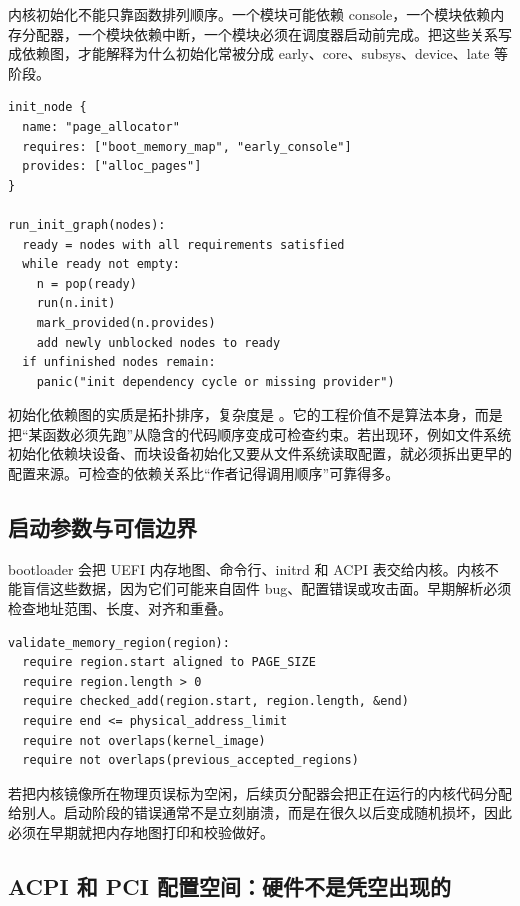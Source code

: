 内核初始化不能只靠函数排列顺序。一个模块可能依赖 console，一个模块依赖内存分配器，一个模块依赖中断，一个模块必须在调度器启动前完成。把这些关系写成依赖图，才能解释为什么初始化常被分成 early、core、subsys、device、late 等阶段。

\begin{lstlisting}
init_node {
  name: "page_allocator"
  requires: ["boot_memory_map", "early_console"]
  provides: ["alloc_pages"]
}

run_init_graph(nodes):
  ready = nodes with all requirements satisfied
  while ready not empty:
    n = pop(ready)
    run(n.init)
    mark_provided(n.provides)
    add newly unblocked nodes to ready
  if unfinished nodes remain:
    panic("init dependency cycle or missing provider")
\end{lstlisting}

\begin{keyidea}
初始化依赖图的实质是拓扑排序，复杂度是 。它的工程价值不是算法本身，而是把“某函数必须先跑”从隐含的代码顺序变成可检查约束。若出现环，例如文件系统初始化依赖块设备、而块设备初始化又要从文件系统读取配置，就必须拆出更早的配置来源。可检查的依赖关系比“作者记得调用顺序”可靠得多。
\end{keyidea}

\subsection{启动参数与可信边界}

bootloader 会把 UEFI 内存地图、命令行、initrd 和 ACPI 表交给内核。内核不能盲信这些数据，因为它们可能来自固件 bug、配置错误或攻击面。早期解析必须检查地址范围、长度、对齐和重叠。

\begin{lstlisting}
validate_memory_region(region):
  require region.start aligned to PAGE_SIZE
  require region.length > 0
  require checked_add(region.start, region.length, &end)
  require end <= physical_address_limit
  require not overlaps(kernel_image)
  require not overlaps(previous_accepted_regions)
\end{lstlisting}

若把内核镜像所在物理页误标为空闲，后续页分配器会把正在运行的内核代码分配给别人。启动阶段的错误通常不是立刻崩溃，而是在很久以后变成随机损坏，因此必须在早期就把内存地图打印和校验做好。

\subsection{ACPI 和 PCI 配置空间：硬件不是凭空出现的}

